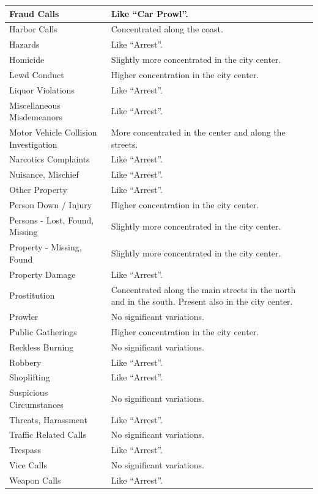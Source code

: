 \begin{longtable}{ | >{\arraybackslash} m{3.8cm} | >{\arraybackslash} m{11.2cm} | }
    Fraud Calls             &   Like ``Car Prowl''. \\
    \hline
    Harbor Calls            &   Concentrated along the coast. \\
    \hline
    Hazards                 &   Like ``Arrest''. \\
    \hline
    Homicide                &   Slightly more concentrated in the city center. \\
    \hline
    Lewd Conduct            &   Higher concentration in the city center. \\
    \hline
    Liquor Violations       &   Like ``Arrest''. \\
    \hline
    Miscellaneous Misdemeanors &   Like ``Arrest''. \\
    \hline
    Motor Vehicle Collision Investigation &   More concentrated in the center and along the streets. \\
    \hline
    Narcotics Complaints    &   Like ``Arrest''. \\
    \hline
    Nuisance, Mischief      &   Like ``Arrest''. \\
    \hline
    Other Property          &   Like ``Arrest''. \\
    \hline
    Person Down / Injury    &   Higher concentration in the city center. \\
    \hline
    Persons - Lost, Found, Missing &   Slightly more concentrated in the city center. \\
    \hline
    Property - Missing, Found    &   Slightly more concentrated in the city center. \\
    \hline
    Property Damage         &   Like ``Arrest''. \\
    \hline
    Prostitution            &   Concentrated along the main streets in the north and in the south. Present also in the city center. \\
    \hline
    Prowler                 &   No significant variations. \\
    \hline
    Public Gatherings       &   Higher concentration in the city center. \\
    \hline
    Reckless Burning        &   No significant variations. \\
    \hline
    Robbery                 &   Like ``Arrest''. \\
    \hline
    Shoplifting             &   Like ``Arrest''. \\
    \hline
    Suspicious Circumstances &   No significant variations. \\
    \hline
    Threats, Harassment     &   Like ``Arrest''. \\
    \hline
    Traffic Related Calls   &   No significant variations. \\
    \hline
    Trespass                &   Like ``Arrest''. \\
    \hline
    Vice Calls              &   No significant variations. \\
    \hline
    Weapon Calls            &   Like ``Arrest''. \\
    \hline


\end{longtable}
